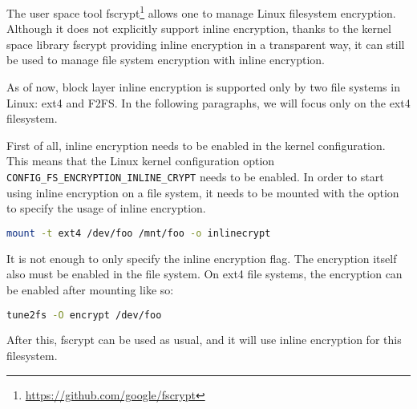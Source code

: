 The user space tool fscrypt\footnote{\url{https://github.com/google/fscrypt}} allows one to manage Linux filesystem encryption. Although it does not explicitly support inline encryption, thanks to the kernel space library fscrypt providing inline encryption in a transparent way, it can still be used to manage file system encryption with inline encryption.


As of now, block layer inline encryption is supported only by two file systems in Linux: ext4 and F2FS. 
In the following paragraphs, we will focus only on the ext4 filesystem.

First of all, inline encryption needs to be enabled in the kernel configuration. This means that the Linux kernel configuration option \verb|CONFIG_FS_ENCRYPTION_INLINE_CRYPT| needs to be enabled.
In order to start using inline encryption on a file system, it needs to be mounted with the option to specify the usage of inline encryption.
\begin{lstlisting}[language=bash]
mount -t ext4 /dev/foo /mnt/foo -o inlinecrypt
\end{lstlisting}
It is not enough to only specify the inline encryption flag. The encryption itself also must be enabled in the file system. On ext4 file systems, the encryption can be enabled after mounting like so:
\begin{lstlisting}[language=bash]
tune2fs -O encrypt /dev/foo
\end{lstlisting}
After this, fscrypt can be used as usual, and it will use inline encryption for this filesystem.



